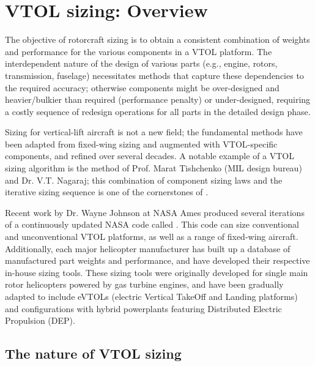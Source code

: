\section{VTOL sizing: Overview}

The objective of rotorcraft sizing is to obtain a consistent combination of weights and performance for the various components in a VTOL platform. The interdependent nature of the design of various parts (e.g., engine, rotors, transmission, fuselage) necessitates methods that capture these dependencies to the required accuracy; otherwise components might be over-designed and heavier/bulkier than required (performance penalty) or under-designed, requiring a costly sequence of redesign operations for all parts in the detailed design phase.

Sizing for vertical-lift aircraft is not a new field; the fundamental methods have been adapted from fixed-wing sizing and augmented with VTOL-specific components, and refined over several decades. A notable example of a VTOL sizing algorithm is the method of Prof. Marat Tishchenko (MIL design bureau) and Dr. V.T. Nagaraj; this combination of component sizing laws and the iterative sizing sequence is one of the cornerstones of \hydra. 

Recent work by Dr. Wayne Johnson at NASA Ames produced several iterations of a continuously updated NASA code called . This code can size conventional and unconventional VTOL platforms, as well as a range of fixed-wing aircraft. Additionally, each major helicopter manufacturer has built up a database of manufactured part weights and performance, and have developed their respective in-house sizing tools. These sizing tools were originally developed for single main rotor helicopters powered by gas turbine engines, and have been gradually adapted to include eVTOLs (electric Vertical TakeOff and Landing platforms) and configurations with hybrid powerplants featuring Distributed Electric Propulsion (DEP).%

\subsection{The nature of VTOL sizing}

